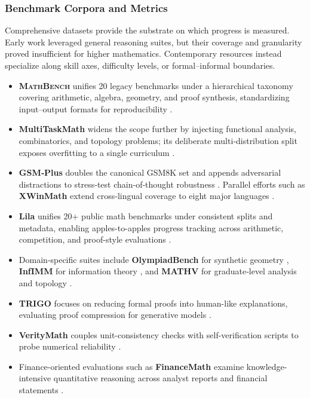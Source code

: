 \documentclass[acmsmall,anonymous]{acmart}
\begin{document}
\subsubsection{Benchmark Corpora and Metrics}\label{sec:benchmarks}
Comprehensive datasets provide the substrate on which progress is measured.  Early work leveraged general reasoning suites, but their coverage and granularity proved insufficient for higher mathematics.  Contemporary resources instead specialize along skill axes, difficulty levels, or formal–informal boundaries.

\begin{itemize}
    \item \textbf{\textsc{MathBench}} unifies 20 legacy benchmarks under a hierarchical taxonomy covering arithmetic, algebra, geometry, and proof synthesis, standardizing input–output formats for reproducibility \cite{yang2024mathbench,mathbench2024}.  
    \item \textbf{MultiTaskMath} widens the scope further by injecting functional analysis, combinatorics, and topology problems; its deliberate multi‐distribution split exposes overfitting to a single curriculum \cite{bang2023multitask}.  
    \item \textbf{GSM‐Plus} doubles the canonical GSM8K set and appends adversarial distractions to stress‐test chain‐of‐thought robustness \cite{li2024gsmplus}.  Parallel efforts such as \textbf{XWinMath} extend cross‐lingual coverage to eight major languages \cite{li2024xwinmath}.  
    \item \textbf{Lila} unifies 20+ public math benchmarks under consistent splits and metadata, enabling apples-to-apples progress tracking across arithmetic, competition, and proof-style evaluations \cite{mishra-2023-lila}.  
    \item Domain‐specific suites include \textbf{OlympiadBench} for synthetic geometry \cite{he2024bolympiadbench}, \textbf{InfIMM} for information theory \cite{han2024infimm}, and \textbf{MATHV} for graduate‐level analysis and topology \cite{wang2024mathv}.  \n    \item \textbf{TRIGO} focuses on reducing formal proofs into human-like explanations, evaluating proof compression for generative models \cite{xiong2023trigobenchmarkingformalmathematical}.\n    \item \textbf{VerityMath} couples unit-consistency checks with self-verification scripts to probe numerical reliability \cite{han2024veritymathadvancingmathematicalreasoning}.
    \item Finance-oriented evaluations such as \textbf{FinanceMath} examine knowledge-intensive quantitative reasoning across analyst reports and financial statements \cite{zhao-2024-financemath}.  

\end{itemize}
\end{document}

